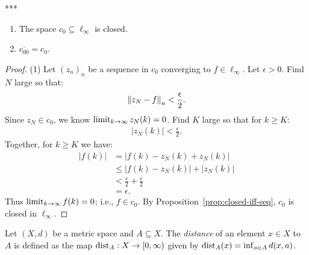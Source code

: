     \begin{proposition}***
        \phantom{a}
        \begin{enumerate}[label = (\arabic*),itemsep=1pt,topsep=3pt]
            \item The space $c_0 \subseteq \ell_\infty$ is closed.
            \item $\overline{c_{00}} = c_0$.
        \end{enumerate}
    \end{proposition}
        \begin{proof}
            (1) Let $(z_n)_n$ be a sequence in $c_0$ converging to $f \in \ell_\infty$. Let $\epsilon > 0$. Find $N$ large so that:
                \begin{equation*}
                \begin{split}
                    \left\lVert z_N - f \right\rVert_u < \frac{\epsilon}{2}.
                \end{split}
                \end{equation*}
            Since $z_N \in c_0$, we know $\operatorname*{limit}_{k \rightarrow \infty} z_N(k) = 0$. Find $K$ large so that for $k \geq K$:
                \begin{equation*}
                \begin{split}
                    |z_N(k)| < \frac{\epsilon}{2}.
                \end{split}
                \end{equation*}
            Together, for $k \geq K$ we have:
                \begin{equation*}
                \begin{split}
                    |f(k)|
                    & = |f(k) - z_N(k) + z_N(k)| \\
                    & \leq |f(k) - z_N(k)| + |z_N(k)| \\
                    & < \frac{\epsilon}{2} + \frac{\epsilon}{2} \\
                    & = \epsilon.
                \end{split}
                \end{equation*}
            Thus $\operatorname*{limit}_{k \rightarrow \infty}f(k) = 0$; i.e., $f \in c_0$. By Proposition~\ref{prop:closed-iff-seq}, $c_0$ is closed in $\ell_\infty$.
        \end{proof}

    \newpage

    \begin{definition}
        Let $(X,d)$ be a metric space and $A \subseteq X$. The \textit{distance} of an element $x \in X$ to $A$ is defined as the map $\operatorname{dist}_A:X \rightarrow [0,\infty)$ given by $\operatorname{dist}_A(x) = \inf_{a \in A}d(x,a)$.
    \end{definition}

